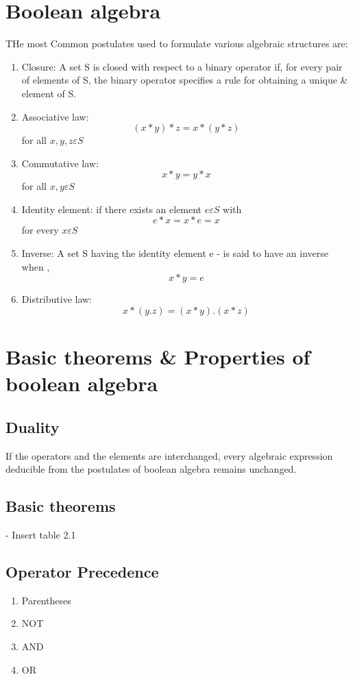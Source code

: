 \section{Boolean algebra}
THe most Common postulates used to formulate various algebraic structures are: 
\begin{enumerate}
    \item Closure: A set S is closed with respect to a binary operator if, for every pair of elements of S, the binary operator specifies a rule for obtaining a unique \& element of S.
    \item Associative law: \[(x*y)*z = x*(y*z)\] for all \(x,y,z \varepsilon S\)  
    \item Commutative law: \[x*y = y*x\] for all \(x,y\varepsilon S\)
    \item Identity element: if there exists an element \(e \varepsilon S\) with \[e*x = x*e = x\] for every \(x \varepsilon S\)
    \item Inverse: A set S having the identity element e - is said to have an inverse when , \[x*y=e\]
    \item Distributive law: \[x*(y.z) = (x*y).(x*z) \]
\end{enumerate}

\section{Basic theorems \& Properties of boolean algebra}
\subsection{Duality} If the operators and the elements are interchanged, every algebraic expression deducible from the postulates of boolean algebra remains unchanged. 
\subsection{Basic theorems}
- Insert table 2.1 
\subsection{Operator Precedence}
\begin{enumerate}
    \item Parentheses
    \item NOT
    \item AND
    \item OR
\end{enumerate}

